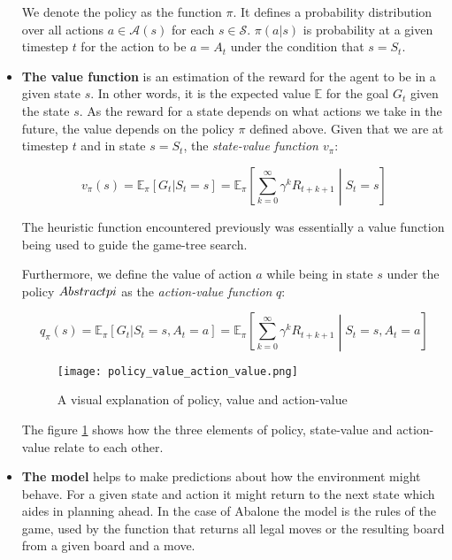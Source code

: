 \begin{itemize}
          We denote the policy as the function $\pi $. It defines a probability distribution over all actions $ a \in \mathcal{A}(s)$ for each $ s \in \mathcal{S} $. $ \pi(a|s)$ is probability at a given timestep $t$ for the action to be $ a = A_t $ under the condition that $ s = S_t $.

    \item \textbf{The value function} is an estimation of the reward for the agent to be in a given state $ s $. In other words, it is the expected value $\mathbb{E}$  for the goal $G_t$ given the state $s$.  As the reward for a state depends on what actions we take in the future, the value depends on the policy $ \pi $ defined above. Given that we are at timestep $ t $ and in state $ s = S_t $, the \textit{state-value function $v_{\pi}$}:

          \begin{equation}
              v_{\pi}(s) = \mathbb{E}_{\pi}[G_t | S_t = s] = \mathbb{E}_{\pi}\left[\sum_{k=0}^{\infty} \gamma^kR_{t+k+1} \middle| S_t = s \right]
          \end{equation}

          The heuristic function encountered previously was essentially a value function being used to guide the game-tree search.

          Furthermore, we define the value of action $a$ while being in state $s$ under the policy $\abstractname{}pi$ as the \textit{action-value function} $q$:


          \begin{equation}
              q_{\pi}(s) = \mathbb{E}_{\pi}[G_t | S_t = s, A_t = a] = \mathbb{E}_{\pi}\left[\sum_{k=0}^{\infty} \gamma^kR_{t+k+1} \middle| S_t = s, A_t = a \right]
          \end{equation}

          \begin{figure}
              \centering
              \texttt{[image: policy\_value\_action\_value.png]}
              \caption{A visual explanation of policy, value and action-value \cite[p.62]{sutton_reinforcement_2018}}
              \label{policy_value_action_value}
          \end{figure}

          The figure \ref{policy_value_action_value} shows how the three elements of policy, state-value and action-value relate to each other.

    \item \textbf{The model} helps to make predictions about how the environment might behave. For a given state and action it might return to the next state which aides in planning ahead. In the case of Abalone the model is the rules of the game, used by the function that returns all legal moves or the resulting board from a given board and a move.
\end{itemize}

